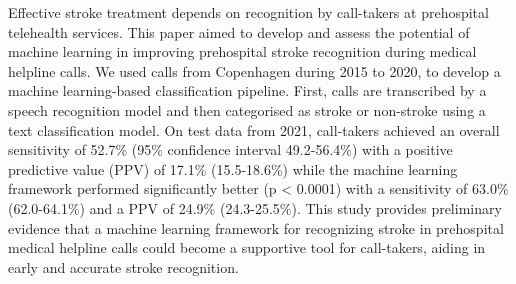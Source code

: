 Effective stroke treatment depends on recognition by call-takers at prehospital telehealth services. This paper aimed to develop and assess the potential of machine learning in improving prehospital stroke recognition during medical helpline calls. 
We used calls from Copenhagen during 2015 to 2020, to develop a machine learning-based classification pipeline. First, calls are transcribed by a speech recognition model and then categorised as stroke or non-stroke using a text classification model.
On test data from 2021, call-takers achieved an overall sensitivity of 52.7\% (95\% confidence interval 49.2-56.4\%) with a positive predictive value (PPV) of 17.1\% (15.5-18.6\%) while the machine learning framework performed significantly better (p < 0.0001) with a sensitivity of 63.0\% (62.0-64.1\%) and a PPV of 24.9\% (24.3-25.5\%).
This study provides preliminary evidence that a machine learning framework for recognizing stroke in prehospital medical helpline calls could become a supportive tool for call-takers, aiding in early and accurate stroke recognition.



